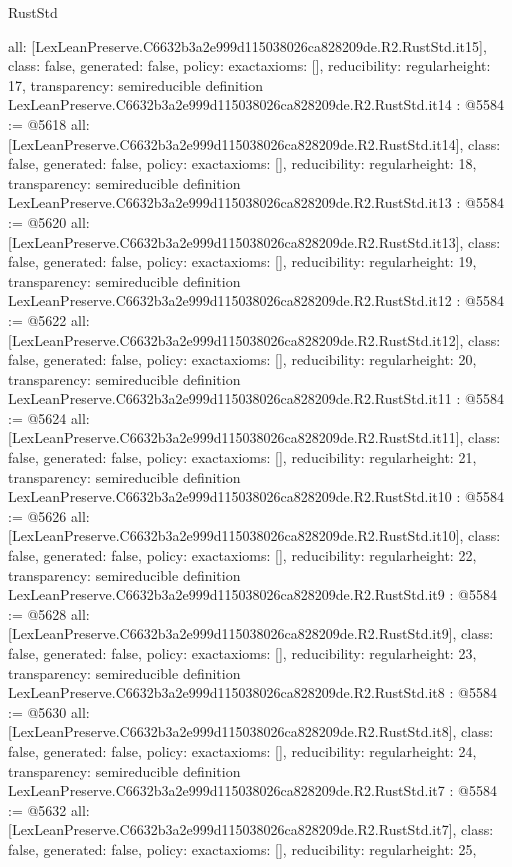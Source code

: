 \begin{lexlean}{RustStd}
\begin{coremodule}
{  all: [LexLeanPreserve.C6632b3a2e999d115038026ca828209de.R2.RustStd.it15],
  class: false,
  generated: false,
  policy: exact{axioms: []},
  reducibility: regular{height: 17},
  transparency: semireducible
}
definition LexLeanPreserve.C6632b3a2e999d115038026ca828209de.R2.RustStd.it14 : @5584 := @5618 {
  all: [LexLeanPreserve.C6632b3a2e999d115038026ca828209de.R2.RustStd.it14],
  class: false,
  generated: false,
  policy: exact{axioms: []},
  reducibility: regular{height: 18},
  transparency: semireducible
}
definition LexLeanPreserve.C6632b3a2e999d115038026ca828209de.R2.RustStd.it13 : @5584 := @5620 {
  all: [LexLeanPreserve.C6632b3a2e999d115038026ca828209de.R2.RustStd.it13],
  class: false,
  generated: false,
  policy: exact{axioms: []},
  reducibility: regular{height: 19},
  transparency: semireducible
}
definition LexLeanPreserve.C6632b3a2e999d115038026ca828209de.R2.RustStd.it12 : @5584 := @5622 {
  all: [LexLeanPreserve.C6632b3a2e999d115038026ca828209de.R2.RustStd.it12],
  class: false,
  generated: false,
  policy: exact{axioms: []},
  reducibility: regular{height: 20},
  transparency: semireducible
}
definition LexLeanPreserve.C6632b3a2e999d115038026ca828209de.R2.RustStd.it11 : @5584 := @5624 {
  all: [LexLeanPreserve.C6632b3a2e999d115038026ca828209de.R2.RustStd.it11],
  class: false,
  generated: false,
  policy: exact{axioms: []},
  reducibility: regular{height: 21},
  transparency: semireducible
}
definition LexLeanPreserve.C6632b3a2e999d115038026ca828209de.R2.RustStd.it10 : @5584 := @5626 {
  all: [LexLeanPreserve.C6632b3a2e999d115038026ca828209de.R2.RustStd.it10],
  class: false,
  generated: false,
  policy: exact{axioms: []},
  reducibility: regular{height: 22},
  transparency: semireducible
}
definition LexLeanPreserve.C6632b3a2e999d115038026ca828209de.R2.RustStd.it9 : @5584 := @5628 {
  all: [LexLeanPreserve.C6632b3a2e999d115038026ca828209de.R2.RustStd.it9],
  class: false,
  generated: false,
  policy: exact{axioms: []},
  reducibility: regular{height: 23},
  transparency: semireducible
}
definition LexLeanPreserve.C6632b3a2e999d115038026ca828209de.R2.RustStd.it8 : @5584 := @5630 {
  all: [LexLeanPreserve.C6632b3a2e999d115038026ca828209de.R2.RustStd.it8],
  class: false,
  generated: false,
  policy: exact{axioms: []},
  reducibility: regular{height: 24},
  transparency: semireducible
}
definition LexLeanPreserve.C6632b3a2e999d115038026ca828209de.R2.RustStd.it7 : @5584 := @5632 {
  all: [LexLeanPreserve.C6632b3a2e999d115038026ca828209de.R2.RustStd.it7],
  class: false,
  generated: false,
  policy: exact{axioms: []},
  reducibility: regular{height: 25},
}
\end{coremodule}
\end{lexlean}
